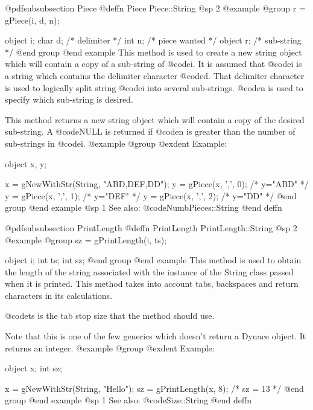 @pdfsubsubsection {Piece}
@deffn {Piece} Piece::String
@sp 2
@example
@group
r = gPiece(i, d, n);

object  i;
char    d;  /*  delimiter     */
int     n;  /*  piece wanted  */
object  r;  /*  sub-string    */
@end group
@end example
This method is used to create a new string object which will contain a
copy of a sub-string of @code{i}.  It is assumed that @code{i} is a
string which contains the delimiter character @code{d}.  That delimiter
character is used to logically split string @code{i} into several
sub-strings.  @code{n} is used to specify which sub-string is desired.

This method returns a new string object which will contain a copy of the
desired sub-string.  A @code{NULL} is returned if @code{n} is greater
than the number of sub-strings in @code{i}.
@example
@group
@exdent Example:

object  x, y;

x = gNewWithStr(String, "ABD,DEF,DD");
y = gPiece(x, ',', 0);  /*  y="ABD"  */
y = gPiece(x, ',', 1);  /*  y="DEF"  */
y = gPiece(x, ',', 2);  /*  y="DD"   */
@end group
@end example
@sp 1
See also:  @code{NumbPieces::String}
@end deffn























@pdfsubsubsection {PrintLength}
@deffn {PrintLength} PrintLength::String
@sp 2
@example
@group
sz = gPrintLength(i, ts);

object  i;
int     ts;
int     sz;
@end group
@end example
This method is used to obtain the length of the string associated with
the instance of the String class passed when it is printed.  This
method takes into account tabs, backspaces and return characters in
its calculations.

@code{ts} is the tab stop size that the method should use.

Note that this is one of the few generics which doesn't return a Dynace
object.  It returns an integer.
@example
@group
@exdent Example:

object  x;
int     sz;

x = gNewWithStr(String, "Hello\tWorld\bx");
sz = gPrintLength(x, 8);
/*  sz = 13   */
@end group
@end example
@sp 1
See also:  @code{Size::String}
@end deffn











